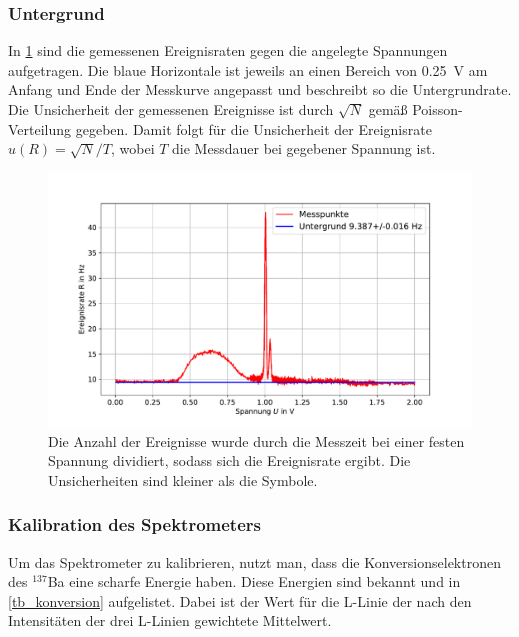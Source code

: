\documentclass[
	a4paper,
	12pt,
	pagesize,
	ngerman
]{scrartcl}
\begin{document}
	\subsubsection{Untergrund}
	In \cref{fg_untergrund} sind die gemessenen Ereignisraten gegen die angelegte Spannungen aufgetragen.
	Die blaue Horizontale ist jeweils an einen Bereich von \SI{0.25}{V} am Anfang und Ende der Messkurve angepasst und beschreibt so die Untergrundrate.
	Die Unsicherheit der gemessenen Ereignisse ist durch $\sqrt{N}$ gemäß Poisson-Verteilung gegeben.
	Damit folgt für die Unsicherheit der Ereignisrate $u(R)=\sqrt{N}/T$, wobei $T$ die Messdauer bei gegebener Spannung ist.
	\begin{figure}[H]
			\includegraphics[width=  \linewidth]{img/untergrund}
			\caption{
			Die Anzahl der Ereignisse wurde durch die Messzeit bei einer festen Spannung dividiert, sodass sich die Ereignisrate ergibt.
			Die Unsicherheiten sind kleiner als die Symbole.
			}
			\label{fg_untergrund}
	\end{figure}

	\subsubsection{Kalibration des Spektrometers}
	Um das Spektrometer zu kalibrieren, nutzt man, dass die Konversionselektronen des $^{137}$Ba eine scharfe Energie haben.
	Diese Energien sind bekannt und in \cref{tb_konversion} aufgelistet.
	Dabei ist der Wert für die L-Linie der nach den Intensitäten der drei L-Linien gewichtete Mittelwert.
\end{document}
